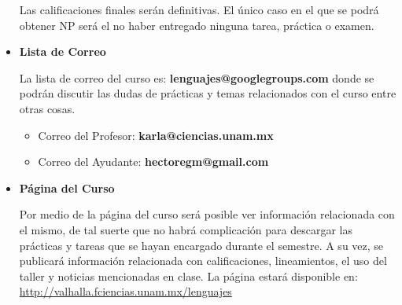 \documentclass[10pt]{article}
\begin{document}
\begin{itemize}
  Las calificaciones finales serán definitivas. El único caso en el que se podrá obtener NP será el no haber entregado ninguna tarea, práctica o examen.

\item \textbf{Lista de Correo}

  La lista de correo del curso es: \textbf{lenguajes@googlegroups.com} donde se
  podrán discutir las dudas de prácticas y temas relacionados
  con el curso entre otras cosas.

  \begin{itemize}
  \item Correo del Profesor: \textbf{karla@ciencias.unam.mx}
  \item Correo del Ayudante: \textbf{hectoregm@gmail.com}
  \end{itemize}

\item \textbf{Página del Curso}

  Por medio de la página del curso será posible ver información relacionada
  con el mismo, de tal suerte que no habrá complicación para descargar las
  prácticas y tareas que se hayan encargado durante el semestre. A su
  vez, se publicará información relacionada con calificaciones,
  lineamientos, el uso del taller y noticias mencionadas en
  clase. La página estará disponible en: \\
  \url{http://valhalla.fciencias.unam.mx/lenguajes}

\end{itemize}
\end{document}
